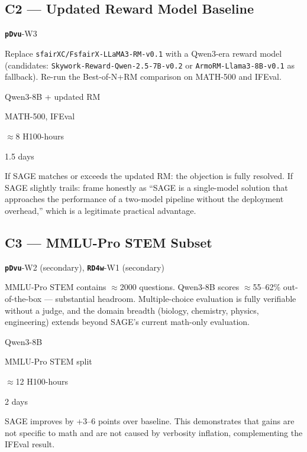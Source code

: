\documentclass[11pt,a4paper]{article}
\newcommand{\rev}[1]{\texttt{\textbf{#1}}}
\begin{document}
\subsection*{C2 --- Updated Reward Model Baseline}

\begin{description}[leftmargin=2cm, style=nextline]
  \item[Covers] \rev{pDvu}-W3
  \item[Procedure] Replace \texttt{sfairXC/FsfairX-LLaMA3-RM-v0.1} with a Qwen3-era reward
    model (candidates: \texttt{Skywork-Reward-Qwen-2.5-7B-v0.2} or
    \texttt{ArmoRM-Llama3-8B-v0.1} as fallback). Re-run the Best-of-N+RM comparison on
    MATH-500 and IFEval.
  \item[Model] Qwen3-8B + updated RM
  \item[Benchmarks] MATH-500, IFEval
  \item[GPU estimate] $\approx$8 H100-hours
  \item[Wall-clock] 1.5 days
  \item[Expected outcome] If SAGE matches or exceeds the updated RM: the objection is fully
    resolved. If SAGE slightly trails: frame honestly as ``SAGE is a single-model solution
    that approaches the performance of a two-model pipeline without the deployment overhead,''
    which is a legitimate practical advantage.
\end{description}

\subsection*{C3 --- MMLU-Pro STEM Subset}

\begin{description}[leftmargin=2cm, style=nextline]
  \item[Covers] \rev{pDvu}-W2 (secondary), \rev{RD4w}-W1 (secondary)
  \item[Rationale] MMLU-Pro STEM contains $\approx$2000 questions. Qwen3-8B scores
    $\approx$55--62\% out-of-the-box --- substantial headroom. Multiple-choice
    evaluation is fully verifiable without a judge, and the domain breadth (biology,
    chemistry, physics, engineering) extends beyond SAGE's current math-only evaluation.
  \item[Model] Qwen3-8B
  \item[Benchmark] MMLU-Pro STEM split
  \item[GPU estimate] $\approx$12 H100-hours
  \item[Wall-clock] 2 days
  \item[Expected outcome] SAGE improves by +3--6 points over baseline. This demonstrates
    that gains are not specific to math and are not caused by verbosity inflation,
    complementing the IFEval result.
\end{description}
\end{document}
